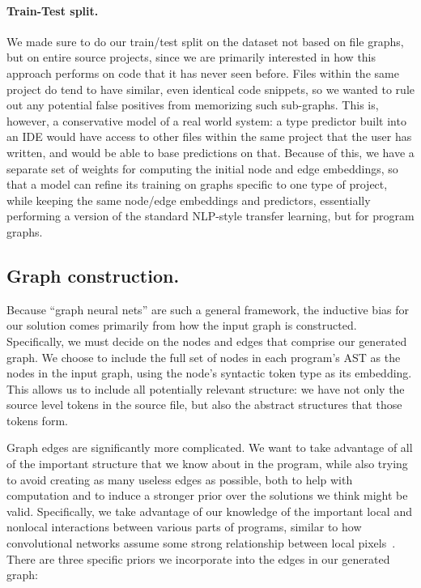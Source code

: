 
\paragraph{Train-Test split.}
We made sure to do our train/test split on the dataset not based on file graphs, but on entire source projects, since we are primarily interested in how this approach performs on code that it has never seen before.
Files within the same project do tend to have similar, even identical code snippets, so we wanted to rule out any potential false positives from memorizing such sub-graphs.
This is, however, a conservative model of a real world system: a type predictor built into an IDE would have access to other files within the same project that the user has written, and would be able to base predictions on that.
Because of this, we have a separate set of weights for computing the initial node and edge embeddings, so that a model can refine its training on graphs specific to one type of project, while keeping the same node/edge embeddings and predictors, essentially performing a version of the standard NLP-style transfer learning, but for program graphs.

\subsection{Graph construction.}
\label{sec:graph-neural-net}
Because ``graph neural nets'' are such a general framework, the inductive bias for our solution comes primarily from how the input graph is constructed.
Specifically, we must decide on the nodes and edges that comprise our generated graph.
We choose to include the full set of nodes in each program's AST as the nodes in the input graph, using the node's syntactic token type as its embedding.
This allows us to include all potentially relevant structure: we have not only the source level tokens in the source file, but also the abstract structures that those tokens form.

Graph edges are significantly more complicated.
We want to take advantage of all of the important structure that we know about in the program, while also trying to avoid creating as many useless edges as possible, both to help with computation and to induce a stronger prior over the solutions we think might be valid.
Specifically, we take advantage of our knowledge of the important local and nonlocal interactions between various parts of programs, similar to how convolutional networks assume some strong relationship between local pixels~\cite{henaff2015deep}.
There are three specific priors we incorporate into the edges in our generated graph:

